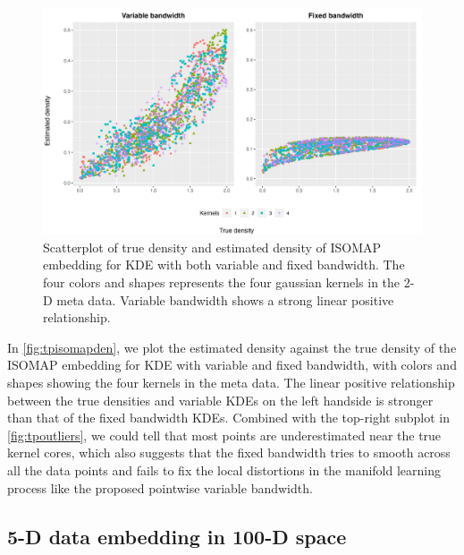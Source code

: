 \documentclass[11pt,a4paper,]{article}
\begin{document}
\begin{figure}

{\centering \includegraphics[width=0.95\linewidth]{figures/Twin Peak_density_comparison_isomap_riem0_1} 

}

\caption{Scatterplot of true density and estimated density of ISOMAP embedding for KDE with both variable and fixed bandwidth. The four colors and shapes represents the four gaussian kernels in the 2-D meta data. Variable bandwidth shows a strong linear positive relationship.}\label{fig:tpisomapden}
\end{figure}

In \autoref{fig:tpisomapden}, we plot the estimated density against the true density of the ISOMAP embedding for KDE with variable and fixed bandwidth, with colors and shapes showing the four kernels in the meta data. The linear positive relationship between the true densities and variable KDEs on the left handside is stronger than that of the fixed bandwidth KDEs. Combined with the top-right subplot in \autoref{fig:tpoutliers}, we could tell that most points are underestimated near the true kernel cores, which also suggests that the fixed bandwidth tries to smooth across all the data points and fails to fix the local distortions in the manifold learning process like the proposed pointwise variable bandwidth.

\hypertarget{fivedgaussian}{%
\subsection{5-D data embedding in 100-D space}\label{fivedgaussian}}
\end{document}
